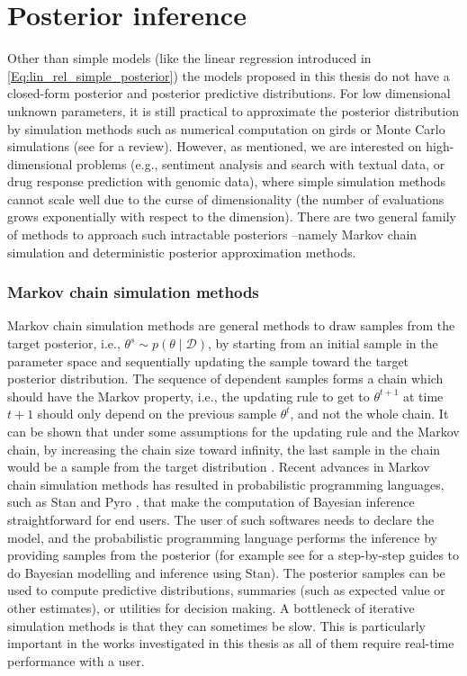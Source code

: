 \documentclass[dissertation,math,vertlayout,pdfa,colorlinks]{aaltoseries}
\newcommand{\bD}{\mathcal{D}}
\begin{document}
\section{Posterior inference} \label{posteriro_inf}
Other than simple models (like the linear regression introduced in \ref{Eq:lin_rel_simple_posterior}) the models proposed in this thesis do not have a closed-form posterior and posterior predictive distributions. For low dimensional unknown parameters, it is still practical to approximate the posterior distribution by simulation methods such as numerical computation on girds or Monte Carlo simulations (see \cite[Chapter~10]{Gelman2013} for a review). However, as mentioned, we are interested on high-dimensional problems (e.g., sentiment analysis and search with textual data, or drug response prediction with genomic data), where simple simulation methods cannot scale well due to the curse of dimensionality (the number of evaluations grows exponentially with respect to the dimension). There are two general family of methods to approach such intractable posteriors --namely Markov chain simulation and deterministic posterior approximation methods.

\subsubsection{Markov chain simulation methods}

Markov chain simulation methods are general methods to draw samples from the target posterior, i.e., $\theta^s \sim p(\theta \mid \bD)$, by starting from an initial sample in the parameter space and sequentially updating the sample toward the target posterior distribution. The sequence of dependent samples forms a chain which should have the Markov property, i.e., the updating rule to get to $\theta^{t+1}$ at time $t+1$ should only depend on the previous sample $\theta^t$, and not the whole chain. It can be shown that under some assumptions for the updating rule and the Markov chain, by increasing the chain size toward infinity, the last sample in the chain would be a sample from the target distribution \cite[Chapter~11]{Gelman2013}. Recent advances in Markov chain simulation methods has resulted in probabilistic programming languages, such as Stan \cite{STAN} and Pyro \cite{bingham2018pyro}, that make the computation of Bayesian inference straightforward for end users. The user of such softwares needs to declare the model, and the probabilistic programming language performs the inference by providing samples from the posterior (for example see \cite{Bayesian_workflow_cog_sci_2019} for a step-by-step guides to do Bayesian modelling and inference using Stan). The posterior samples can be used to compute predictive distributions, summaries (such as expected value or other estimates), or utilities for decision making. A bottleneck of iterative simulation methods is that they can sometimes be slow. This is particularly important in the works investigated in this thesis as all of them require real-time performance with a user.
\end{document}
